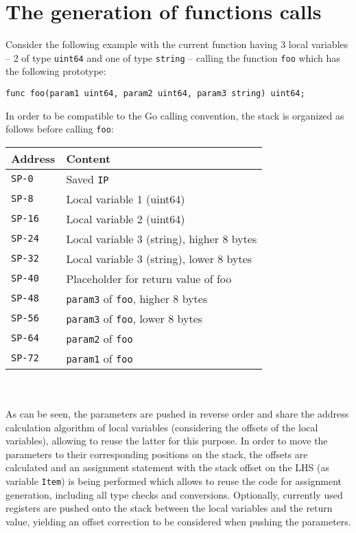 \documentclass[a4paper]{scrreprt}
\begin{document}
    \section{The generation of functions calls} \label{The generation of functions}
      Consider the following example with the current function having 3 local variables -- 2 of type \texttt{uint64} and one of type \texttt{string} -- calling the function \texttt{foo} which has the following prototype:
        \begin{lstlisting}
func foo(param1 uint64, param2 uint64, param3 string) uint64;
        \end{lstlisting}
      In order to be compatible to the Go calling convention, the stack is organized as follows before calling \texttt{foo}:
      \begin{table}[h!]
      \begin{tabular}{ll}
        \toprule
        \textbf{Address} & \textbf{Content}\\
        \midrule
        \texttt{SP-0} & Saved \texttt{IP}\\
        \texttt{SP-8} & Local variable 1 (uint64)\\
        \texttt{SP-16} & Local variable 2 (uint64)\\
        \texttt{SP-24} & Local variable 3 (string), higher 8 bytes\\
        \texttt{SP-32} & Local variable 3 (string), lower 8 bytes\\
        \midrule
        \texttt{SP-40} & Placeholder for return value of foo\\
        \texttt{SP-48} & \texttt{param3} of \texttt {foo}, higher 8 bytes\\
        \texttt{SP-56} & \texttt{param3} of \texttt {foo}, lower 8 bytes\\
        \texttt{SP-64} & \texttt{param2} of \texttt {foo}\\
        \texttt{SP-72} & \texttt{param1} of \texttt {foo}\\
        \bottomrule
      \end{tabular}
      \end{table}\\ \\
      As can be seen, the parameters are pushed in reverse order and share the address calculation algorithm of local variables (considering the offsets of the local variables), allowing to reuse the latter for this purpose. In order to move the parameters to their corresponding positions on the stack, the offsets are calculated and an assignment statement with the stack offset on the LHS (as variable \texttt{Item}) is being performed which allows to reuse the code for assignment generation, including all type checks and conversions. Optionally, currently used registers are pushed onto the stack between the local variables and the return value, yielding an offset correction to be considered when pushing the parameters.\\
\end{document}
